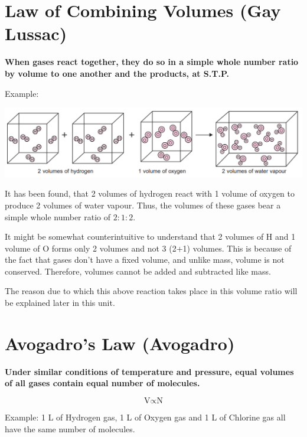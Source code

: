 \documentclass[
  14pt,
]{extarticle}
\renewenvironment{quote}{\begin{myquote}}{\end{myquote}}
\begin{document}
\hypertarget{law-of-combining-volumes-gay-lussac}{%
\section{Law of Combining Volumes (Gay
Lussac)}\label{law-of-combining-volumes-gay-lussac}}

\textbf{When gases react together, they do so in a simple whole number
ratio by volume to one another and the products, at S.T.P.}

Example:

\begin{center}\includegraphics{./images/2022-06-22-23-18-27.png}\end{center}

It has been found, that 2 volumes of hydrogen react with 1 volume of
oxygen to produce 2 volumes of water vapour. Thus, the volumes of these
gases bear a simple whole number ratio of \(2:1:2\).

\begin{quote}
It might be somewhat counterintuitive to understand that 2 volumes of H
and 1 volume of O forms only 2 volumes and not 3 (2+1) volumes. This is
because of the fact that gases don't have a fixed volume, and unlike
mass, volume is not conserved. Therefore, volumes cannot be added and
subtracted like mass.

The reason due to which this above reaction takes place in this volume
ratio will be explained later in this unit.
\end{quote}

\hypertarget{avogadros-law-avogadro}{%
\section{Avogadro's Law (Avogadro)}\label{avogadros-law-avogadro}}

\textbf{Under similar conditions of temperature and pressure, equal
volumes of all gases contain equal number of molecules.}

\[\text{V}\propto\text{N}\]

Example: 1 L of Hydrogen gas, 1 L of Oxygen gas and 1 L of Chlorine gas
all have the same number of molecules.
\end{document}
